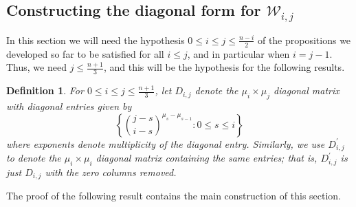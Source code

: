 \documentclass[11pt]{article}
\newtheorem{definition}[theo]{Definition}
\theoremstyle{definition}
\numberwithin{equation}{section}
\numberwithin{equation}{section}
\newcommand{\W}{\mathcal{W}}
\begin{document}
\subsection{Constructing the diagonal form for \texorpdfstring{$\W_{i,j}$}{Wij}}

In this section we will need the hypothesis $0 \leq i \leq j \leq \frac{n-i}{2}$ of the propositions we developed so far to be satisfied for all $i \leq j$, and in particular when $i = j-1$.  Thus, we need $j \leq \frac{n+1}{3}$, and this will be the hypothesis for the following results.

\begin{definition}\label{d:diag_for_w}
For $0 \leq i \leq j \leq \frac{n+1}{3}$, let $D_{i,j}$ denote the $\mu_{i} \times \mu_{j}$ diagonal matrix with diagonal entries given by 
\[ \left\{ \binom{j-s}{i-s}^{\mu_s - \mu_{s-1}} : 0 \leq s \leq i \right\} \]
where exponents denote multiplicity of the diagonal entry.  Similarly, we use $D_{i,j}^{\prime}$ to denote the $\mu_{i} \times \mu_{i}$ diagonal matrix containing the same entries; that is, $D_{i,j}^{\prime}$ is just $D_{i,j}$ with the zero columns removed.
\end{definition}

The proof of the following result contains the main construction of this section.
\end{document}
